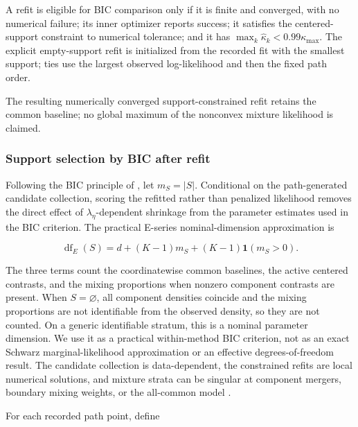 \documentclass[preprint,12pt,authoryear]{elsarticle}
\begin{document}
A refit is eligible for BIC comparison only if it is finite and converged,
with no numerical failure; its inner optimizer reports success; it satisfies the
centered-support constraint to numerical tolerance; and it has
$\max_k\widehat\kappa_k<0.99\kappa_{\max}$. The explicit empty-support refit is
initialized from the recorded fit with the smallest support; ties use the
largest observed log-likelihood and then the fixed path order.

The resulting numerically converged support-constrained refit retains the
common baseline; no global
maximum of the nonconvex mixture likelihood is claimed.

\subsubsection{Support selection by BIC after refit}
\label{subsec:bic-refit}

Following the BIC principle of \citet{schwarz1978bic}, let $m_S=|S|$.
Conditional on the path-generated candidate collection, scoring the refitted
rather than penalized likelihood removes the direct effect of
$\lambda_\eta$-dependent shrinkage from the parameter estimates used in the
BIC criterion. The practical E-series nominal-dimension approximation is

\begin{equation}
\label{eq:nominal-df}
\operatorname{df}_{E}(S)
=d+(K-1)m_S+(K-1)\mathbf 1(m_S>0).
\end{equation}

The three terms count the coordinatewise common baselines, the active centered
contrasts, and the mixing proportions when nonzero component contrasts are
present. When $S=\varnothing$, all component densities coincide and the mixing
proportions are not identifiable from the observed density, so they are not
counted. On a generic identifiable stratum, this is a nominal parameter
dimension. We use it as a practical within-method BIC criterion,
not as an exact Schwarz marginal-likelihood approximation or an effective
degrees-of-freedom result. The candidate collection is data-dependent, the
constrained refits are local numerical solutions, and mixture strata can be
singular at component mergers, boundary mixing weights, or the all-common
model \citep{drton2017singularbic}.

For each recorded path point, define
\end{document}
